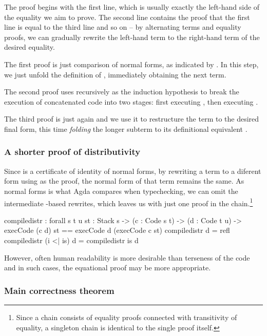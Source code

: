 \noindent The proof begins with the first line, which is usually exactly the
left-hand side of the equality we aim
to prove.  The second line contains the proof that the first line is equal to
the third line and so on -- by alternating terms and equality proofs, we can
gradually rewrite the left-hand term to the right-hand term of the desired
equality.

The first proof is just comparison of normal forms, as indicated by
. In this step, we just unfold the definition of ,
immediately obtaining the next term.

The second proof uses  recursively as the induction
hypothesis to break the execution of concatenated code into two stages: first
executing , then executing .

The third proof is just  again and we use it to restructure the
term to the desired final form, this time \emph{folding} the longer
subterm to its definitional equivalent .

\subsubsection{A shorter proof of distributivity}

Since  is a certificate of identity of normal forms, by rewriting
a term to a diferent form using  as the proof, the normal form of
that term remains the same. As normal forms is what Agda compares when typechecking,
we can omit the intermediate -based rewrites, which leaves us
with just one proof in the chain.\footnote{Since a chain consists of equality
proofs connected with transitivity of equality, a singleton chain is identical
to the single proof itself.}

\begin{code}
  compile\-distr : forall {s t u} {st : Stack s}
    -> (c : Code s t) -> (d : Code t u)
    -> execCode (c \app d) st == execCode d (execCode c st)
  compile\-distr \nil d = refl
  compile\-distr (i <| is) d = compile\-distr is d
\end{code}

\noindent However, often human readability is more desirable than terseness of
the code and in such cases, the equational proof may be more appropriate.

\subsubsection{Main correctness theorem}

